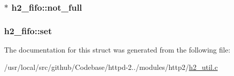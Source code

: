\subsubsection[{\texorpdfstring{not\+\_\+full}{not_full}}]{$\ast$ h2\+\_\+fifo\+::not\+\_\+full}\hypertarget{structh2__fifo_ae3a7e0e9693da10035a490e25c3da966}{}\label{structh2__fifo_ae3a7e0e9693da10035a490e25c3da966}
\subsubsection[{\texorpdfstring{set}{set}}]{ h2\+\_\+fifo\+::set}\hypertarget{structh2__fifo_a465006ad1ba0ecab8f76cc20bac1d2e5}{}\label{structh2__fifo_a465006ad1ba0ecab8f76cc20bac1d2e5}


The documentation for this struct was generated from the following file\+:\begin{DoxyCompactItemize}
\item 
/usr/local/src/github/\+Codebase/httpd-\/2../modules/http2/\hyperlink{h2__util_8c}{h2\+\_\+util.\+c}\end{DoxyCompactItemize}
